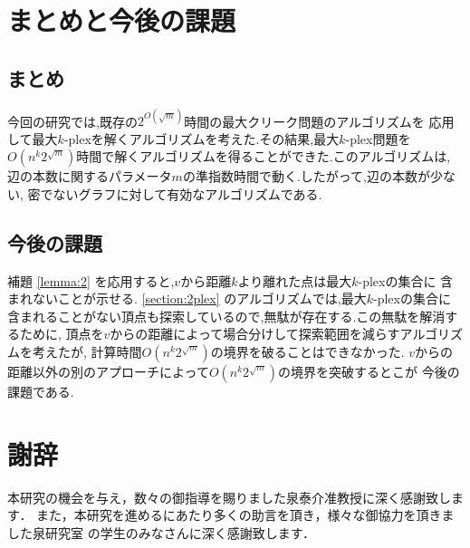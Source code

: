 \documentclass{thesis}
\theoremstyle{definition}
\begin{document}
\chapter{まとめと今後の課題}
\section{まとめ}
今回の研究では,既存の$2^{O(\sqrt{m})}$時間の最大クリーク問題のアルゴリズムを
応用して最大$k$-plexを解くアルゴリズムを考えた.その結果,最大$k$-plex問題を
$O(n^{k}2^{\sqrt{m}})$時間で解くアルゴリズムを得ることができた.このアルゴリズムは,
辺の本数に関するパラメータ$m$の準指数時間で動く.したがって,辺の本数が少ない,
密でないグラフに対して有効なアルゴリズムである.

\section{今後の課題}
補題  \ref{lemma:2} を応用すると,$v$から距離$k$より離れた点は最大$k$-plexの集合に
含まれないことが示せる. \ref{section:2plex} のアルゴリズムでは,最大$k$-plexの集合に
含まれることがない頂点も探索しているので,無駄が存在する.この無駄を解消するために,
頂点を$v$からの距離によって場合分けして探索範囲を減らすアルゴリズムを考えたが,
計算時間$O(n^{k}2^{\sqrt{m}})$の境界を破ることはできなかった.
$v$からの距離以外の別のアプローチによって$O(n^{k}2^{\sqrt{m}})$の境界を突破するとこが
今後の課題である.

\newpage

\chapter*{謝辞}
本研究の機会を与え，数々の御指導を賜りました泉泰介准教授に深く感謝致します．
また，本研究を進めるにあたり多くの助言を頂き，様々な御協力を頂きました泉研究室
の学生のみなさんに深く感謝致します．

\newpage


\end{document}
